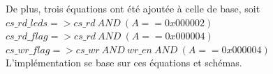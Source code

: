 \par
De plus, trois équations ont été ajoutée à celle de base, soit \\
$cs\_rd\_leds => cs\_rd \: AND\:(A == 0x000002)$\\
$cs\_rd\_flag => cs\_rd \: AND \: (A == 0x000004)$\\
$cs\_wr\_flag => cs\_wr \: AND\: wr\_en \:AND\: (A == 0x000004)$\\
L'implémentation se base sur ces équations et schémas.